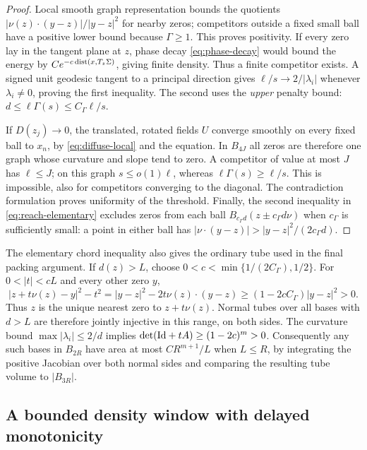 \begin{proof}
Local smooth graph representation bounds the quotients
$|\nu(z)\cdot(y-z)|/|y-z|^2$ for nearby zeros; competitors outside a
fixed small ball have a positive lower bound because $\Gamma\ge1$.
This proves positivity.  If every zero lay in the tangent plane at
$z$, phase decay \eqref{eq:phase-decay} would bound the energy by
$C e^{-c\operatorname{dist}(x,T_z\Sigma)}$, giving finite density.  Thus a finite
competitor exists.  A signed unit geodesic tangent to a principal
direction gives
$\ell/s\to2/|\lambda_i|$ whenever $\lambda_i\ne0$, proving the first
inequality.  The second uses the \emph{upper} penalty bound:
$d\le\ell\Gamma(s)\le C_\Gamma\ell/s$.

If $D(z_j)\to0$, the translated, rotated fields $U$ converge smoothly
on every fixed ball to $x_n$, by \eqref{eq:diffuse-local} and the
equation.  In $B_{4J}$ all zeros are therefore one graph whose
curvature and slope tend to zero.  A competitor of value at most
$J$ has $\ell\le J$; on this graph $s\le o(1)\ell$, whereas
$\ell\Gamma(s)\ge\ell/s$.  This is impossible, also for competitors
converging to the diagonal.  The contradiction formulation proves
uniformity of the threshold.  Finally, the second inequality in
\eqref{eq:reach-elementary} excludes zeros from each ball
$B_{c_\Gamma d}(z\pm c_\Gamma d\nu)$ when $c_\Gamma$ is sufficiently
small: a point in either ball has
$|\nu\cdot(y-z)|>|y-z|^2/(2c_\Gamma d)$.
\end{proof}

\begin{remark}\label{rem:reach-ordinary-tube}
The elementary chord inequality also gives the ordinary tube used
in the final packing argument.  If $d(z)>L$, choose
$0<c<\min\{1/(2C_\Gamma),1/2\}$.  For $0<|t|<cL$ and every other zero $y$,
\[
 |z+t\nu(z)-y|^2-t^2
 =|y-z|^2-2t\nu(z)\cdot(y-z)
 \ge(1-2cC_\Gamma)|y-z|^2>0.
\]
Thus $z$ is the unique nearest zero to $z+t\nu(z)$.  Normal tubes
over all bases with $d>L$ are therefore jointly injective in this
range, on both sides.  The curvature bound
$\max|\lambda_i|\le2/d$ implies
$\det(\mathrm{Id}+tA)\ge(1-2c)^m>0$.  Consequently any such bases in
$B_{2R}$ have area at most $C R^{m+1}/L$ when $L\le R$, by integrating
the positive Jacobian over both normal sides and
comparing the resulting tube volume to $|B_{3R}|$.
\end{remark}

\subsection{A bounded density window with delayed monotonicity}

